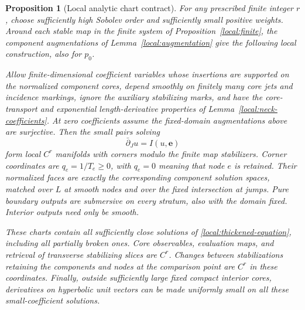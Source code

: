 \documentclass[11pt]{article}
\newtheorem{proposition}[theorem]{Proposition}
\theoremstyle{definition}
\theoremstyle{remark}
\numberwithin{equation}{section}
\begin{document}
\begin{proposition}[Local analytic chart contract]\label{local:charts}
For any prescribed finite integer $r$, choose sufficiently high Sobolev
order and sufficiently small positive weights.  Around each stable
map in the finite system of Proposition~\ref{local:finite}, the
component augmentations of Lemma~\ref{local:augmentation} give the
following local construction, also for $p_0$.

Allow finite-dimensional coefficient variables whose insertions are
supported on the normalized component cores, depend smoothly on
finitely many core jets and incidence markings, ignore the auxiliary
stabilizing marks, and have the core-transport and exponential
length-derivative properties of Lemma~\ref{local:neck-coefficients}.
At zero coefficients assume the fixed-domain augmentations above
are surjective.  Then the small pairs solving
\begin{equation}\label{local:thickened-equation}
 \bar\partial_Ju=I(u,\mathbf e)
\end{equation}
form local $C^r$ manifolds with corners modulo the finite map
stabilizers.  Corner coordinates are $q_e=1/T_e\geq0$, with $q_e=0$
meaning that node $e$ is retained.  Their normalized faces are exactly
the corresponding component solution spaces, matched over $L$ at
smooth nodes and over the fixed intersection at jumps.  Pure boundary
outputs are submersive on every stratum, also with the domain fixed.
Interior outputs need only be smooth.

These charts contain all sufficiently close solutions of
\eqref{local:thickened-equation}, including all partially broken ones.
Core observables, evaluation maps, and retrieval of transverse
stabilizing slices are $C^r$.  Changes between stabilizations retaining
the components and nodes at the comparison point are $C^r$ in these
coordinates.  Finally, outside sufficiently large fixed compact
interior cores, derivatives on hyperbolic unit vectors can be made
uniformly small on all these small-coefficient solutions.
\end{proposition}
\end{document}
